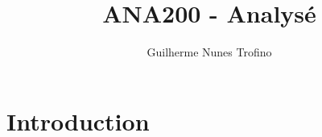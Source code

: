 \documentclass{article}
\title{ANA200 - Analysé}
\author{Guilherme Nunes Trofino}
\begin{document}
\maketitle

\newpage\tableofcontents

\section{Introduction}
\end{document}
